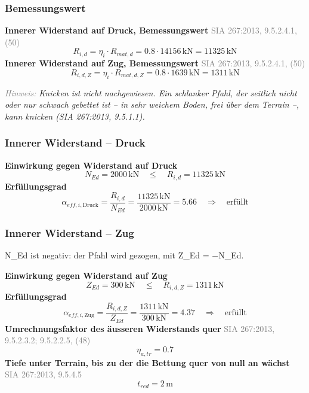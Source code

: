 \documentclass[11pt,a4paper]{article}
\newcommand{\normref}[1]{{\small\textcolor{gray}{#1}}}
\newcommand{\hinweis}[2]{\par\noindent\textcolor{gray}{\textit{#1:}} \textit{#2}\par}
\begin{document}
\subsubsection{Bemessungswert}
\noindent\textbf{Innerer Widerstand auf Druck, Bemessungswert} \hfill \normref{SIA 267:2013, 9.5.2.4.1, (50)}
\begin{equation*}
R_{i,d} = \eta_i \cdot R_{mat,d} = 0.8 \cdot 14156\,\mathrm{kN} = 11325\,\mathrm{kN}
\end{equation*}
\noindent\textbf{Innerer Widerstand auf Zug, Bemessungswert} \hfill \normref{SIA 267:2013, 9.5.2.4.1, (50)}
\begin{equation*}
R_{i,d,Z} = \eta_i \cdot R_{mat,d,Z} = 0.8 \cdot 1639\,\mathrm{kN} = 1311\,\mathrm{kN}
\end{equation*}
\hinweis{Hinweis}{Knicken ist nicht nachgewiesen. Ein schlanker Pfahl, der seitlich nicht oder nur schwach gebettet ist -- in sehr weichem Boden, frei über dem Terrain --, kann knicken (SIA 267:2013, 9.5.1.1).}
\subsubsection{Innerer Widerstand – Druck}
\noindent\textbf{Einwirkung gegen Widerstand auf Druck}
\begin{equation*}
N_{Ed} = 2000\,\mathrm{kN} \quad \le \quad R_{i,d} = 11325\,\mathrm{kN}
\end{equation*}
\noindent\textbf{Erfüllungsgrad}
\begin{equation*}
\alpha_{eff,i,\text{Druck}} = \frac{R_{i,d}}{N_{Ed}} = \frac{11325\,\mathrm{kN}}{2000\,\mathrm{kN}} = 5.66 \quad \Rightarrow \quad \text{erfüllt}
\end{equation*}
\subsubsection{Innerer Widerstand – Zug}
N\_Ed ist negativ: der Pfahl wird gezogen, mit Z\_Ed = −N\_Ed.

\noindent\textbf{Einwirkung gegen Widerstand auf Zug}
\begin{equation*}
Z_{Ed} = 300\,\mathrm{kN} \quad \le \quad R_{i,d,Z} = 1311\,\mathrm{kN}
\end{equation*}
\noindent\textbf{Erfüllungsgrad}
\begin{equation*}
\alpha_{eff,i,\text{Zug}} = \frac{R_{i,d,Z}}{Z_{Ed}} = \frac{1311\,\mathrm{kN}}{300\,\mathrm{kN}} = 4.37 \quad \Rightarrow \quad \text{erfüllt}
\end{equation*}
\noindent\textbf{Umrechnungsfaktor des äusseren Widerstands quer} \hfill \normref{SIA 267:2013, 9.5.2.3.2; 9.5.2.2.5, (48)}
\begin{equation*}
\eta_{a,tr} = 0.7
\end{equation*}
\noindent\textbf{Tiefe unter Terrain, bis zu der die Bettung quer von null an wächst} \hfill \normref{SIA 267:2013, 9.5.4.5}
\begin{equation*}
t_{red} = 2\,\mathrm{m}
\end{equation*}
\end{document}
